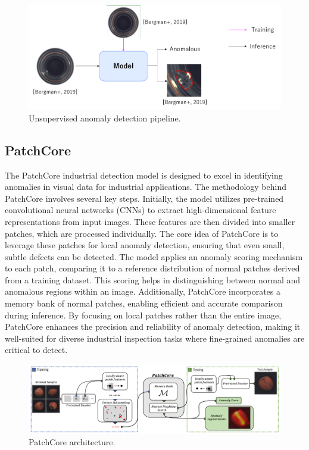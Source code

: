 \begin{figure}[h]
	\begin{center}
		\includegraphics[width=0.8\linewidth]{Chapter_2/uiad.png}
	\end{center}
	\caption{Unsupervised anomaly detection pipeline.}
	\label{fig:cnn}
\end{figure}

\clearpage
\subsection{PatchCore}
\label{patchcore}
The PatchCore industrial detection model is designed to excel in identifying anomalies in visual data for industrial applications. The methodology behind PatchCore involves several key steps. Initially, the model utilizes pre-trained convolutional neural networks (CNNs) to extract high-dimensional feature representations from input images. These features are then divided into smaller patches, which are processed individually. The core idea of PatchCore is to leverage these patches for local anomaly detection, ensuring that even small, subtle defects can be detected. The model applies an anomaly scoring mechanism to each patch, comparing it to a reference distribution of normal patches derived from a training dataset. This scoring helps in distinguishing between normal and anomalous regions within an image. Additionally, PatchCore incorporates a memory bank of normal patches, enabling efficient and accurate comparison during inference. By focusing on local patches rather than the entire image, PatchCore enhances the precision and reliability of anomaly detection, making it well-suited for diverse industrial inspection tasks where fine-grained anomalies are critical to detect.

\begin{figure}[h]
	\begin{center}
		\includegraphics[width=0.9\linewidth]{Chapter_2/patchcore.png}
	\end{center}
	\caption{PatchCore architecture.}
	\label{fig:cnn}
\end{figure}

